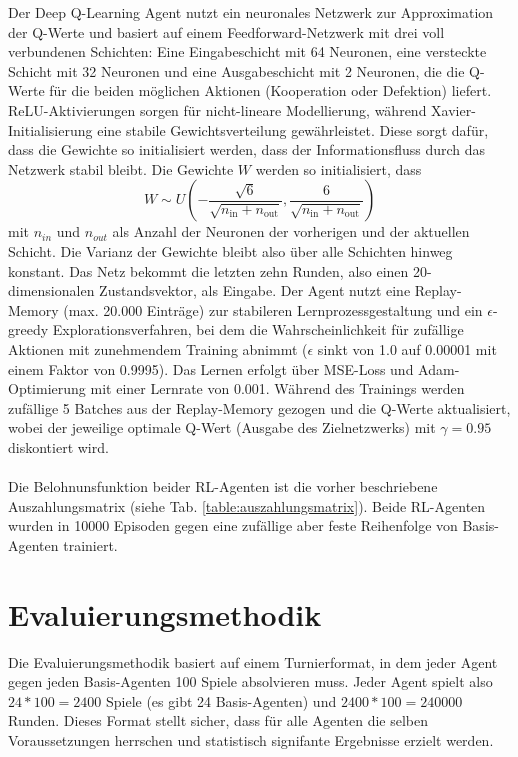 Der Deep Q-Learning Agent nutzt ein neuronales Netzwerk zur Approximation der Q-Werte und basiert auf einem 
Feedforward-Netzwerk mit drei voll verbundenen Schichten: Eine Eingabeschicht mit 64 Neuronen, eine versteckte 
Schicht mit 32 Neuronen und eine Ausgabeschicht mit 2 Neuronen, die die Q-Werte für die beiden möglichen Aktionen 
(Kooperation oder Defektion) liefert. ReLU-Aktivierungen sorgen für nicht-lineare Modellierung, während Xavier-Initialisierung 
eine stabile Gewichtsverteilung gewährleistet. Diese sorgt dafür, dass die Gewichte so initialisiert werden, dass der 
Informationsfluss durch das Netzwerk stabil bleibt. Die Gewichte $W$ werden so initialisiert, dass
\begin{equation}
    W \sim U \left( -\frac{\sqrt{6}}{\sqrt{n_{\text{in}}+n_{\text{out}}}}, \frac{6}{\sqrt{n_{\text{in}}+n_{\text{out}}}} \right)
\end{equation}
mit $n_{in}$ und $n_{out}$ als Anzahl der Neuronen der vorherigen und der aktuellen Schicht. Die Varianz der Gewichte bleibt
also über alle Schichten hinweg konstant.
Das Netz bekommt die letzten zehn Runden, also einen 20-dimensionalen 
Zustandsvektor, als Eingabe. Der Agent nutzt eine Replay-Memory (max. 20.000 Einträge) zur stabileren 
Lernprozessgestaltung und ein $\epsilon$-greedy Explorationsverfahren, bei dem die Wahrscheinlichkeit für zufällige Aktionen mit 
zunehmendem Training abnimmt ($\epsilon$ sinkt von 1.0 auf 0.00001 mit einem Faktor von 0.9995). Das Lernen erfolgt über MSE-Loss und Adam-Optimierung mit 
einer Lernrate von 0.001.
Während des Trainings werden zufällige 5 Batches aus der Replay-Memory gezogen und die Q-Werte 
aktualisiert, wobei der jeweilige optimale Q-Wert (Ausgabe des Zielnetzwerks) mit $\gamma=0.95$ diskontiert wird. \\ \\
Die Belohnunsfunktion beider RL-Agenten ist die vorher beschriebene Auszahlungsmatrix (siehe Tab. \ref{table:auszahlungsmatrix}).
Beide RL-Agenten wurden in 10000 Episoden gegen eine zufällige aber feste Reihenfolge von Basis-Agenten trainiert.


\section{Evaluierungsmethodik}
Die Evaluierungsmethodik basiert auf einem Turnierformat, in dem jeder Agent gegen jeden Basis-Agenten 100 Spiele 
absolvieren muss. Jeder Agent spielt also $24 * 100 = 2400$ Spiele (es gibt 24 Basis-Agenten) und $2400 * 100 = 240000$ Runden. Dieses Format
stellt sicher, dass für alle Agenten die selben Voraussetzungen herrschen und statistisch signifante Ergebnisse erzielt werden.
